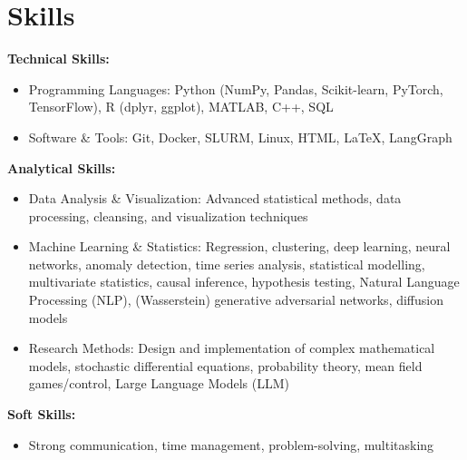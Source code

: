 \section{Skills}
\textbf{Technical Skills:}
\begin{itemize}[leftmargin=*]
    \item Programming Languages: Python (NumPy, Pandas, Scikit-learn, PyTorch, TensorFlow), R (dplyr, ggplot), MATLAB, C++, SQL
    \item Software \& Tools: Git, Docker, SLURM, Linux, HTML, \LaTeX, LangGraph
\end{itemize}
\textbf{Analytical Skills:}
\begin{itemize}[leftmargin=*]
    \item Data Analysis \& Visualization: Advanced statistical methods, data processing, cleansing, and visualization techniques
    \item Machine Learning \& Statistics: Regression, clustering, deep learning, neural networks, anomaly detection, time series analysis, statistical modelling, multivariate statistics, causal inference, hypothesis testing, Natural Language Processing (NLP), (Wasserstein) generative adversarial networks, diffusion models
    \item Research Methods: Design and implementation of complex mathematical models, stochastic differential equations, probability theory, mean field games/control, Large Language Models (LLM)
\end{itemize}
\textbf{Soft Skills:}
\begin{itemize}[leftmargin=*]
    \item Strong communication, time management, problem-solving, multitasking
\end{itemize}
